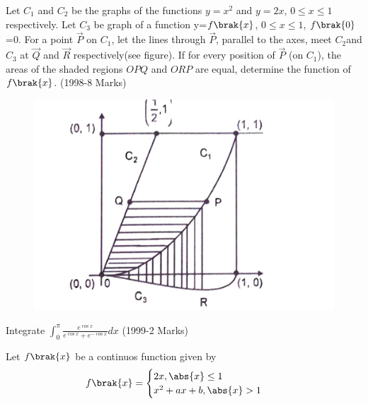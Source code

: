 \item Let $C_1$ and $C_2$ be the graphs of the functions $y=x^2$ and $y=2x$, $0\le x\le1$ respectively. Let $C_3$ be graph of a function  y=$f\brak{x}$, $0\le x \le 1$, $f\brak{0}$=0. For a point $\vec{P}$ on $C_1$, let the lines through $\vec{P}$, parallel to the axes, meet $C_2$and $C_3$ at $\vec{Q}$ and $\vec{R}$ respectively(see figure). If for every position of $\vec{P}$ (on $C_1$), the areas of the shaded regions $OPQ$ and $ORP$ are equal, determine the function of $f\brak{x}$.
\hfill{(1998-8 Marks)}
\begin{figure}[ht]
\centering
\includegraphics[scale=0.5]{JEE/Definite-Integrals-Applications-Integrals/subjective/36-49/Figs/fig1.png} 
\end{figure}
\item Integrate $\int_{0}^{\pi}\frac{e^{\cos{x}}}{e^{\cos{x}}+e^{-\cos{x}}}dx$
 \hfill{(1999-2 Marks)}\\	      			
\item Let $f\brak{x}$ be a continuos function given by 
	\begin{align}
	f\brak{x} &=
	\begin{cases}
	2x, \abs{x}\le1\\
	x^2+ax+b, \abs{x}>1
	\end{cases}
	\end{align}
